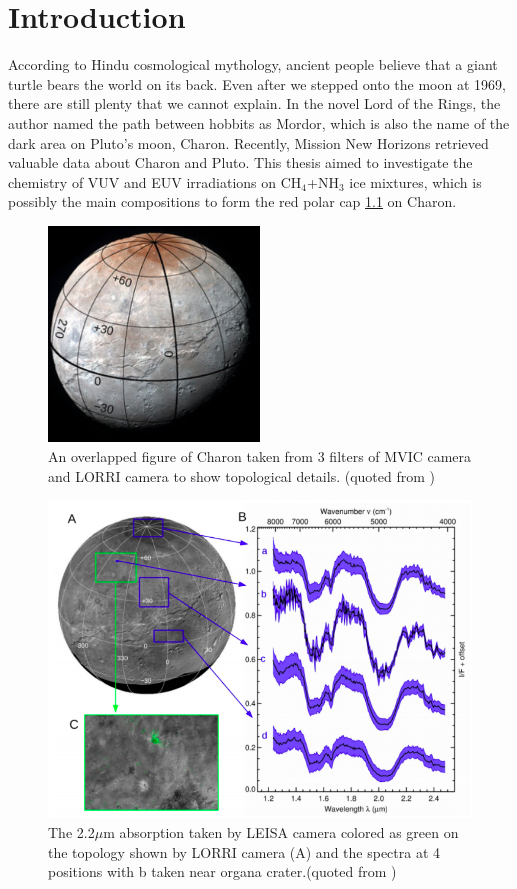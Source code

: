 \chapter{\protect Introduction}
\label{introduction}

According to Hindu cosmological mythology, ancient people believe that a giant turtle bears the world on its back. Even after we stepped onto the moon at 1969, there are still plenty that we cannot explain. In the novel Lord of the Rings, the author named the path between hobbits as Mordor, which is also the name of the dark area on Pluto's moon, Charon. Recently, Mission New Horizons retrieved valuable data about Charon and Pluto. This thesis aimed to investigate the chemistry of VUV and EUV irradiations on CH$_4$+NH$_3$ ice mixtures, which is possibly the main compositions to form the red polar cap \ref{fig:charon} on Charon.

\begin{figure}
\centering
\includegraphics[width=0.5\textwidth]{figures/chapter1/charon.png}
\caption{An overlapped figure of Charon taken from 3 filters of MVIC camera and LORRI camera to show topological details. (quoted from \cite{grundy2016formation})}
\label{fig:charon}
\end{figure}

\begin{figure}
\centering
\includegraphics[width=\textwidth]{figures/chapter1/IR.png}
\caption{The 2.2$\mu$m absorption taken by LEISA camera colored as green on the topology shown by LORRI camera (A) and the spectra at 4 positions with b taken near organa crater.(quoted from \cite{grundy2016surface})}
\label{fig:Charon_IR}
\end{figure}

